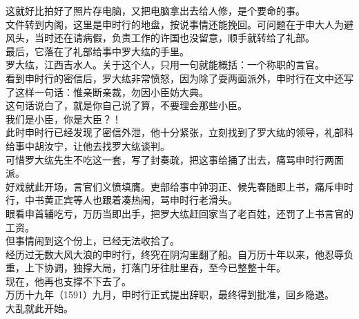 \begin{multicols}{\theparacolNo}
这就好比拍好了照片存电脑，又把电脑拿出去给人修，是个要命的事。\\

文件转到内阁，这里是申时行的地盘，按说事情还能挽回。可问题在于申大人为避风头，当时还在请病假，负责工作的许国也没留意，顺手就转给了礼部。\\

最后，它落在了礼部给事中罗大纮的手里。\\

罗大纮，江西吉水人。关于这个人，只用一句就能概括：一个称职的言官。\\

看到申时行的密信后，罗大纮非常愤怒，因为除了耍两面派外，申时行在文中还写了这样一句话：惟亲断亲裁，勿因小臣妨大典。\\

这句话说白了，就是你自己说了算，不要理会那些小臣。\\

我们是小臣，你是大臣？！\\

此时申时行已经发现了密信外泄，他十分紧张，立刻找到了罗大纮的领导，礼部科给事中胡汝宁，让他去找罗大纮谈判。\\

可惜罗大纮先生不吃这一套，写了封奏疏，把这事给捅了出去，痛骂申时行两面派。\\

好戏就此开场，言官们义愤填膺。吏部给事中钟羽正、候先春随即上书，痛斥申时行，中书黄正宾等人也跟着凑热闹，骂申时行老滑头。\\

眼看申首辅吃亏，万历当即出手，把罗大纮赶回家当了老百姓，还罚了上书言官的工资。\\

但事情闹到这个份上，已经无法收拾了。\\

经历过无数大风大浪的申时行，终究在阴沟里翻了船。自万历十年以来，他忍辱负重，上下协调，独撑大局，打落门牙往肚里吞，至今已整整十年。\\

现在，他再也支撑不下去了。\\

万历十九年（1591）九月，申时行正式提出辞职，最终得到批准，回乡隐退。\\

大乱就此开始。\\

\ifnum{}
	\end{multicols}
\fi
\newpage
